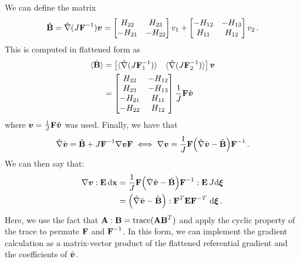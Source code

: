 \documentclass[../doc.tex]{subfiles}
\begin{document}
We can define the matrix 
	\begin{equation} \label{fem:bmat_parts}
		\hat{\mat{B}} = \hnabla(J\mat{F}^{-1}) \vec{v} = \begin{bmatrix} 
			H_{22} & H_{23} \\ -H_{21} & -H_{22}
		\end{bmatrix} v_1 + 
		\begin{bmatrix} 
			-H_{12} & -H_{13} \\ H_{11} & H_{12} 
		\end{bmatrix} v_2 \,. 
	\end{equation}
This is computed in flattened form as 
	\begin{equation} \label{fem:bhat_flat}
	\begin{aligned}
		\ang{\hat{\mat{B}}} &= \begin{bmatrix} 
			\ang{\hnabla(J\F_1^{-1})} & \ang{\hnabla(J\F_2^{-1})}
		\end{bmatrix} \vec{v} \\
		&= \begin{bmatrix} 
			H_{22} & -H_{12} \\ H_{23} & -H_{13} \\ -H_{21} & H_{11} \\ -H_{22} & H_{12} 
		\end{bmatrix} \frac{1}{J}\F\hvec{v} 
	\end{aligned}
	\end{equation}
where $\vec{v} = \frac{1}{J}\F\hvec{v}$ was used. Finally, we have that 
	\begin{equation}
		\hnabla \hvec{v} = \hat{\mat{B}} + J \F^{-1} \nabla\vec{v} \F \iff \nabla\vec{v} = \frac{1}{J}\F\!\paren{\hnabla\hvec{v} - \hat{\mat{B}}}\!\F^{-1} \,. 
	\end{equation}
We can then say that:
	\begin{equation} \label{fem:nablaE_trans}
	\begin{aligned}
		\nabla\vec{v} : \E \ud \x &= \frac{1}{J}\F\!\paren{\hnabla\hvec{v} - \hat{\mat{B}}}\!\F^{-1} : \E \, J \!\ud \vec{\xi} \\
		&= \paren{\hnabla\hvec{v} - \hat{\mat{B}}} : \F^{T} \E \F^{-T} \,\ud\vec{\xi} \,. 
	\end{aligned}
	\end{equation}
Here, we use the fact that $\mat{A} : \mat{B} = \tr(\mat{A}\mat{B}^T)$ and apply the cyclic property of the trace to permute $\mat{F}$ and $\mat{F}^{-1}$. 
In this form, we can implement the gradient calculation as a matrix-vector product of the flattened referential gradient and the coefficients of $\hvec{v}$. 
\end{document}
